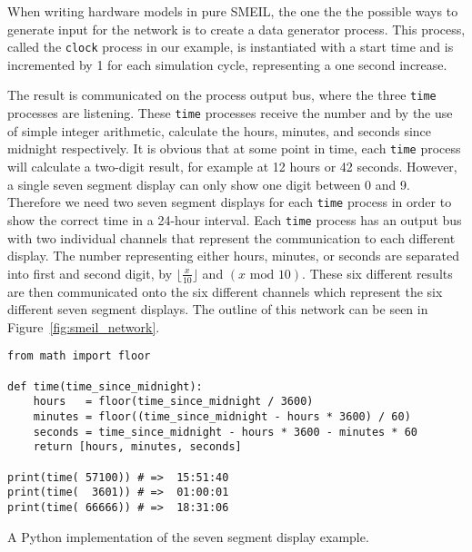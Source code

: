 When writing hardware models in pure SMEIL, the one the the possible ways to generate input for the network is to create a data generator process. This process, called the \texttt{clock} process in our example, is instantiated with a start time and is incremented by 1 for each simulation cycle, representing a one second increase.

The result is communicated on the process output bus, where the three \texttt{time} processes are listening. These \texttt{time} processes receive the number and by the use of simple integer arithmetic, calculate the hours, minutes, and seconds since midnight respectively. It is obvious that at some point in time, each \texttt{time} process will calculate a two-digit result, for example at 12 hours or 42 seconds. However, a single seven segment display can only show one digit between 0 and 9. Therefore we need two seven segment displays for each \texttt{time} process in order to show the correct time in a 24-hour interval. Each \texttt{time} process has an output bus with two individual channels that represent the communication to each different display. The number representing either hours, minutes, or seconds are separated into first and second digit, by $\lfloor \frac{x}{10} \rfloor$ and $(x \text{ mod } 10)$. These six different results are then communicated onto the six different channels which represent the six different seven segment displays.
The outline of this network can be seen in Figure~\ref{fig:smeil_network}.
\begin{listing}
\begin{verbatim}
from math import floor

def time(time_since_midnight):
    hours   = floor(time_since_midnight / 3600)
    minutes = floor((time_since_midnight - hours * 3600) / 60)
    seconds = time_since_midnight - hours * 3600 - minutes * 60
    return [hours, minutes, seconds]

print(time( 57100)) # =>  15:51:40
print(time(  3601)) # =>  01:00:01
print(time( 66666)) # =>  18:31:06
\end{verbatim}
\caption{A Python implementation of the seven segment display example.}
\label{lst:python}
\end{listing}
